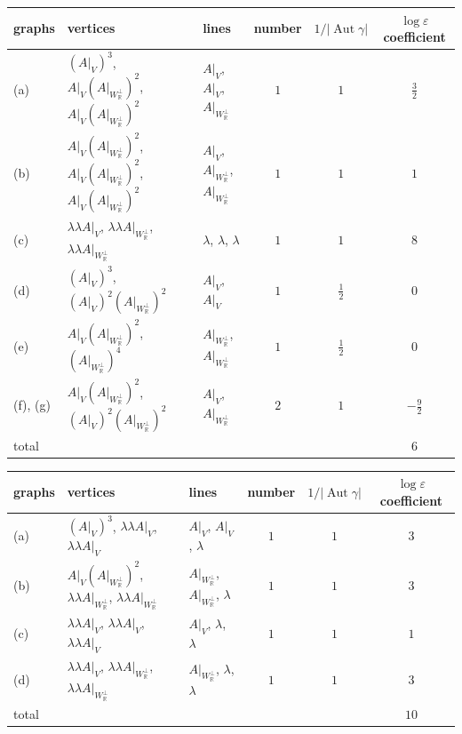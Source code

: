 \begin{tabular}{l|l|l|c|c|c}
graphs & vertices & lines & number & $1/|\operatorname{Aut}\gamma|$ & $\log\varepsilon$ coefficient \\
\hline
(a) & $(A|_V)^3$, $A|_V(A|_{W_{\mathbb R}^\perp})^2$, $A|_V(A|_{W_{\mathbb R}^\perp})^2$ & $A|_V$, $A|_V$, $A|_{W_{\mathbb R}^\perp}$ & $1$ & $1$ & $\tfrac{3}{2}$ \\
(b) & $A|_V(A|_{W_{\mathbb R}^\perp})^2$, $A|_V(A|_{W_{\mathbb R}^\perp})^2$, $A|_V(A|_{W_{\mathbb R}^\perp})^2$ & $A|_V$, $A|_{W_{\mathbb R}^\perp}$, $A|_{W_{\mathbb R}^\perp}$ & $1$ & $1$ & $1$ \\
(c) & $\lambda\lambda A|_V$, $\lambda\lambda A|_{W_{\mathbb R}^\perp}$, $\lambda\lambda A|_{W_{\mathbb R}^\perp}$ & $\lambda$, $\lambda$, $\lambda$ & $1$ & $1$ & $8$ \\
(d) & $(A|_V)^3$, $(A|_V)^2(A|_{W_{\mathbb R}^\perp})^2$ & $A|_V$, $A|_V$ & $1$ & $\tfrac12$ & $0$ \\
(e) & $A|_V(A|_{W_{\mathbb R}^\perp})^2$, $(A|_{W_{\mathbb R}^\perp})^4$ & $A|_{W_{\mathbb R}^\perp}$, $A|_{W_{\mathbb R}^\perp}$ & $1$ & $\tfrac12$ & $0$ \\
(f), (g) & $A|_V(A|_{W_{\mathbb R}^\perp})^2$, $(A|_V)^2(A|_{W_{\mathbb R}^\perp})^2$ & $A|_V$, $A|_{W_{\mathbb R}^\perp}$ & $2$ & $1$ & $-\tfrac{9}{2}$ \\
total & & & & & $6$ \\
\end{tabular}


\begin{tabular}{l|l|l|c|c|c}
graphs & vertices & lines & number & $1/|\operatorname{Aut}\gamma|$ & $\log\varepsilon$ coefficient \\
\hline
(a) & $(A|_V)^3$, $\lambda\lambda A|_V$, $\lambda\lambda A|_V$ & $A|_V$, $A|_V$, $\lambda$ & $1$ & $1$ & $3$ \\
(b) & $A|_V(A|_{W_{\mathbb R}^\perp})^2$, $\lambda\lambda A|_{W_{\mathbb R}^\perp}$, $\lambda\lambda A|_{W_{\mathbb R}^\perp}$ & $A|_{W_{\mathbb R}^\perp}$, $A|_{W_{\mathbb R}^\perp}$, $\lambda$ & $1$ & $1$ & $3$ \\
(c) & $\lambda\lambda A|_V$, $\lambda\lambda A|_V$, $\lambda\lambda A|_V$ & $A|_V$, $\lambda$, $\lambda$ & $1$ & $1$ & $1$ \\
(d) & $\lambda\lambda A|_V$, $\lambda\lambda A|_{W_{\mathbb R}^\perp}$, $\lambda\lambda A|_{W_{\mathbb R}^\perp}$ & $A|_{W_{\mathbb R}^\perp}$, $\lambda$, $\lambda$ & $1$ & $1$ & $3$ \\
total & & & & & $10$ \\
\end{tabular}

